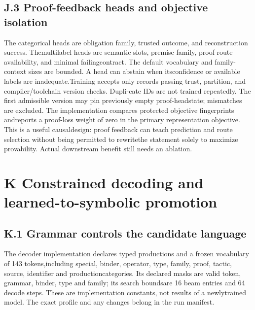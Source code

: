 \subsection*{J.3  Proof-feedback heads and objective isolation}
\noindent
The categorical heads are obligation family, trusted outcome, and reconstruction success. The\linebreak[4]
multilabel heads are semantic slots, premise family, proof-route availability, and minimal failing\linebreak[4]
contract. The default vocabulary and family-context sizes are bounded. A head can abstain when its\linebreak[4]
confidence or available labels are inadequate.\linebreak[4]
Training accepts only records passing trust, partition, and compiler/toolchain version checks. Dupli-\linebreak[4]
cate IDs are not trained repeatedly. The first admissible version may pin previously empty proof-head\linebreak[4]
state; mismatches are excluded. The implementation compares protected objective fingerprints and\linebreak[4]
reports a proof-loss weight of zero in the primary representation objective. This is a useful causal\linebreak[4]
design: proof feedback can teach prediction and route selection without being permitted to rewrite\linebreak[4]
the statement solely to maximize provability. Actual downstream benefit still needs an ablation.\par

\section*{K  Constrained decoding and learned-to-symbolic promotion}
\subsection*{K.1  Grammar controls the candidate language}
\noindent
The decoder implementation declares typed productions and a frozen vocabulary of 143 tokens,\linebreak[4]
including special, binder, operator, type, family, proof, tactic, source, identifier and production\linebreak[4]
categories. Its declared masks are valid token, grammar, binder, type and family; its search bounds\linebreak[4]
are 16 beam entries and 64 decode steps. These are implementation constants, not results of a newly\linebreak[4]
trained model. The exact profile and any changes belong in the run manifest.\par

